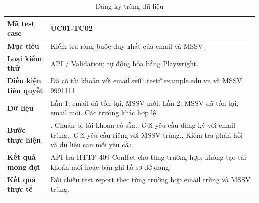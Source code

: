 \begin{table}[H]
\centering
\begingroup\small
\renewcommand{\arraystretch}{1.18}
\caption{Đăng ký trùng dữ liệu}\label{tab:i1-detail-2}
\begin{tabularx}{\linewidth}{@{}p{.23\linewidth}>{\raggedright\arraybackslash}X@{}}
\toprule
\textbf{Mã test case} & \textbf{UC01-TC02} \\\midrule
\textbf{Mục tiêu} & Kiểm tra ràng buộc duy nhất của email và MSSV. \\ \addlinespace[3pt]
\textbf{Loại kiểm thử} & API / Validation; tự động hóa bằng Playwright. \\ \addlinespace[3pt]
\textbf{Điều kiện tiên quyết} & Đã có tài khoản với email sv01.test@example.edu.vn và MSSV 9991111. \\ \addlinespace[3pt]
\textbf{Dữ liệu} & Lần 1: email đã tồn tại, MSSV mới. Lần 2: MSSV đã tồn tại, email mới. Các trường khác hợp lệ. \\ \addlinespace[3pt]
\textbf{Bước thực hiện} & 1. Chuẩn bị tài khoản có sẵn.\newline 2. Gửi yêu cầu đăng ký với email trùng.\newline 3. Gửi yêu cầu riêng với MSSV trùng.\newline 4. Kiểm tra phản hồi và dữ liệu sau mỗi yêu cầu. \\ \addlinespace[3pt]
\textbf{Kết quả mong đợi} & API trả HTTP 409 Conflict cho từng trường hợp; không tạo tài khoản mới hoặc bản ghi hồ sơ dở dang. \\ \addlinespace[3pt]
\textbf{Kết quả thực tế} & Đối chiếu test report theo từng trường hợp email trùng và MSSV trùng. \\ \addlinespace[3pt]
\bottomrule
\end{tabularx}
\endgroup
\end{table}

